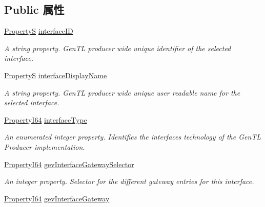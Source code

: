 \subsection*{Public 属性}
\begin{DoxyCompactItemize}
\item 
\hyperlink{classmv_i_m_p_a_c_t_1_1acquire_1_1_property_s}{Property\+S} \hyperlink{classmv_i_m_p_a_c_t_1_1acquire_1_1_gen_i_cam_1_1_interface_module_a652ecc53eafb859fb73d7a16fe99cbb6}{interface\+I\+D}
\begin{DoxyCompactList}\small\item\em A string property. Gen\+T\+L producer wide unique identifier of the selected interface. \end{DoxyCompactList}\item 
\hyperlink{classmv_i_m_p_a_c_t_1_1acquire_1_1_property_s}{Property\+S} \hyperlink{classmv_i_m_p_a_c_t_1_1acquire_1_1_gen_i_cam_1_1_interface_module_ac291438ff28ee97dafc491f6b16c811a}{interface\+Display\+Name}
\begin{DoxyCompactList}\small\item\em A string property. Gen\+T\+L producer wide unique user readable name for the selected interface. \end{DoxyCompactList}\item 
\hyperlink{group___common_interface_ga81749b2696755513663492664a18a893}{Property\+I64} \hyperlink{classmv_i_m_p_a_c_t_1_1acquire_1_1_gen_i_cam_1_1_interface_module_ab3a56f3f46e153929e7cf2bb8ab09cac}{interface\+Type}
\begin{DoxyCompactList}\small\item\em An enumerated integer property. Identifies the interfaces technology of the Gen\+T\+L Producer implementation. \end{DoxyCompactList}\item 
\hyperlink{group___common_interface_ga81749b2696755513663492664a18a893}{Property\+I64} \hyperlink{classmv_i_m_p_a_c_t_1_1acquire_1_1_gen_i_cam_1_1_interface_module_a8bcec48c92c925d6a4b7077446187008}{gev\+Interface\+Gateway\+Selector}
\begin{DoxyCompactList}\small\item\em An integer property. Selector for the different gateway entries for this interface. \end{DoxyCompactList}\item 
\hyperlink{group___common_interface_ga81749b2696755513663492664a18a893}{Property\+I64} \hyperlink{classmv_i_m_p_a_c_t_1_1acquire_1_1_gen_i_cam_1_1_interface_module_aa2197643d10449676d08f8b97f3b4765}{gev\+Interface\+Gateway}

\end{DoxyCompactItemize}
